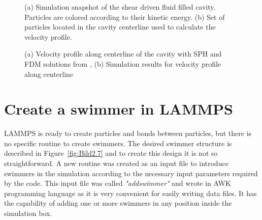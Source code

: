 \begin{figure}[ht]
\centering
  \begin{footnotesize}
  
  \caption[(a) Simulation snapshot of the shear driven fluid filled cavity. Particles are colored according to their kinetic energy. (b) Set of particles located in the cavity centerline used to calculate the velocity profile.]{(a) Simulation snapshot of the shear driven fluid filled cavity. Particles are colored according to their kinetic energy. (b) Set of particles located in the cavity centerline used to calculate the velocity profile.}
  \label{fig:Bild3.1}
  \end{footnotesize}
\end{figure} 



\begin{figure}[H]
\centering
  \begin{footnotesize}
  
  \caption[(a) Velocity profile along centerline of the cavity with SPH and FDM (Finite Difference Method) solutions from \cite{neece_tait_1968} , (b) Simulation results for velocity profile along centerline ]{(a) Velocity profile along centerline of the cavity with SPH and FDM solutions from \cite{neece_tait_1968} , (b) Simulation results for velocity profile along centerline }
  \label{fig:Bild3.2}
  \end{footnotesize}
\end{figure} 



\section{Create a swimmer in LAMMPS}
\label{sec:section 2}

LAMMPS is ready to create particles and bonds between particles, but there is no specific routine to create swimmers. The desired swimmer structure is described in Figure~\ref{fig:Bild2.7}
and to create this design it is not so straightforward. A new routine was created as an input file to introduce swimmers in the simulation according to the necessary input parameters
required by the code. This input file was called \textit{"addswimmer"} and wrote in AWK programming language as it is very convenient for easily writing data files. It has 
the capability of adding one or more swimmers in any position inside the simulation box.\par

